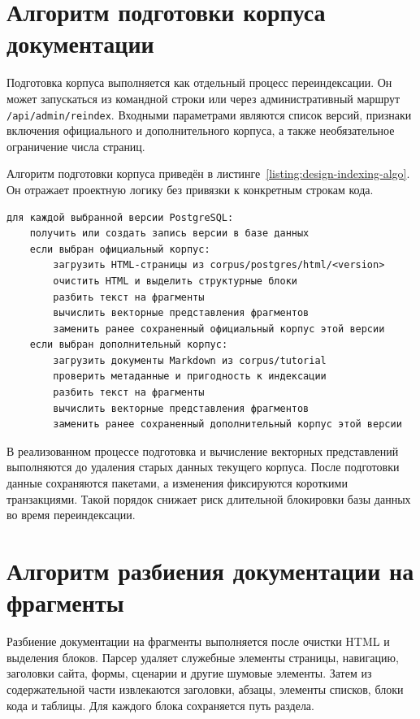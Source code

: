 \par\endgroup

\section{Алгоритм подготовки корпуса документации}

Подготовка корпуса выполняется как отдельный процесс переиндексации. Он может запускаться из командной строки или через административный маршрут \texttt{/api/admin/reindex}. Входными параметрами являются список версий, признаки включения официального и дополнительного корпуса, а также необязательное ограничение числа страниц.

Алгоритм подготовки корпуса приведён в листинге~\ref{listing:design-indexing-algo}. Он отражает проектную логику без привязки к конкретным строкам кода.

\begin{listingblock}
\label{listing:design-indexing-algo}
\begin{verbatim}
для каждой выбранной версии PostgreSQL:
    получить или создать запись версии в базе данных
    если выбран официальный корпус:
        загрузить HTML-страницы из corpus/postgres/html/<version>
        очистить HTML и выделить структурные блоки
        разбить текст на фрагменты
        вычислить векторные представления фрагментов
        заменить ранее сохраненный официальный корпус этой версии
    если выбран дополнительный корпус:
        загрузить документы Markdown из corpus/tutorial
        проверить метаданные и пригодность к индексации
        разбить текст на фрагменты
        вычислить векторные представления фрагментов
        заменить ранее сохраненный дополнительный корпус этой версии
\end{verbatim}
\end{listingblock}

В реализованном процессе подготовка и вычисление векторных представлений выполняются до удаления старых данных текущего корпуса. После подготовки данные сохраняются пакетами, а изменения фиксируются короткими транзакциями. Такой порядок снижает риск длительной блокировки базы данных во время переиндексации.

\section{Алгоритм разбиения документации на фрагменты}

Разбиение документации на фрагменты выполняется после очистки HTML и выделения блоков. Парсер удаляет служебные элементы страницы, навигацию, заголовки сайта, формы, сценарии и другие шумовые элементы. Затем из содержательной части извлекаются заголовки, абзацы, элементы списков, блоки кода и таблицы. Для каждого блока сохраняется путь раздела.

